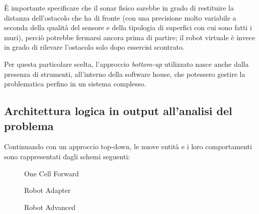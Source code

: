 È importante specificare che il sonar fisico sarebbe in grado di restituire la distanza dell'ostacolo che ha di fronte
(con una precisione molto variabile a seconda della qualità del sensore e della tipologia di superfici con cui sono fatti i muri),
perciò potrebbe fermarsi ancora prima di partire;
il robot virtuale è invece in grado di rilevare l'ostacolo solo dopo essercisi scontrato.

Per questa particolare scelta, l'approccio \textit{bottom-up} utilizzato nasce anche dalla presenza di strumenti, all'interno della software house, che potessero gestire la problematica perfino in un sistema complesso.

\subsection{Architettura logica in output all'analisi del problema}

Continuando con un approccio top-down, le nuove entità e i loro comportamenti sono rappresentati dagli schemi seguenti:

\begin{figure}[H]
  \centering
  \caption{One Cell Forward}%
  \label{fig:sp2:ocf}
\end{figure}

\begin{figure}[H]
  \centering
  \caption{Robot Adapter}%
  \label{fig:sp2:r_adpt}
\end{figure}

\begin{figure}[H]
  \centering
  \caption{Robot Advanced}%
  \label{fig:sp2:r_adv}
\end{figure}





